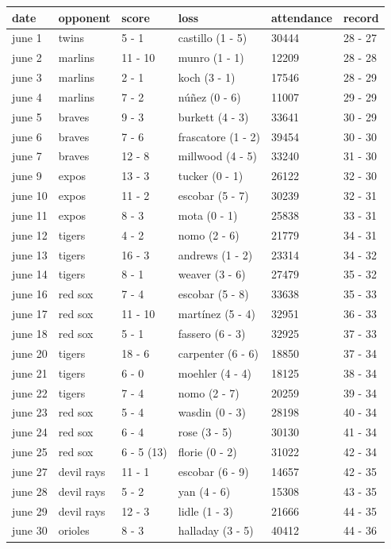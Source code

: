 \documentclass{article}
\begin{document}
\begin{tabular}{llllll}
\toprule
date & opponent & score & loss & attendance & record \\
\midrule
june 1 & twins & 5 - 1 & castillo (1 - 5) & 30444 & 28 - 27 \\
june 2 & marlins & 11 - 10 & munro (1 - 1) & 12209 & 28 - 28 \\
june 3 & marlins & 2 - 1 & koch (3 - 1) & 17546 & 28 - 29 \\
june 4 & marlins & 7 - 2 & núñez (0 - 6) & 11007 & 29 - 29 \\
june 5 & braves & 9 - 3 & burkett (4 - 3) & 33641 & 30 - 29 \\
june 6 & braves & 7 - 6 & frascatore (1 - 2) & 39454 & 30 - 30 \\
june 7 & braves & 12 - 8 & millwood (4 - 5) & 33240 & 31 - 30 \\
june 9 & expos & 13 - 3 & tucker (0 - 1) & 26122 & 32 - 30 \\
june 10 & expos & 11 - 2 & escobar (5 - 7) & 30239 & 32 - 31 \\
june 11 & expos & 8 - 3 & mota (0 - 1) & 25838 & 33 - 31 \\
june 12 & tigers & 4 - 2 & nomo (2 - 6) & 21779 & 34 - 31 \\
june 13 & tigers & 16 - 3 & andrews (1 - 2) & 23314 & 34 - 32 \\
june 14 & tigers & 8 - 1 & weaver (3 - 6) & 27479 & 35 - 32 \\
june 16 & red sox & 7 - 4 & escobar (5 - 8) & 33638 & 35 - 33 \\
june 17 & red sox & 11 - 10 & martínez (5 - 4) & 32951 & 36 - 33 \\
june 18 & red sox & 5 - 1 & fassero (6 - 3) & 32925 & 37 - 33 \\
june 20 & tigers & 18 - 6 & carpenter (6 - 6) & 18850 & 37 - 34 \\
june 21 & tigers & 6 - 0 & moehler (4 - 4) & 18125 & 38 - 34 \\
june 22 & tigers & 7 - 4 & nomo (2 - 7) & 20259 & 39 - 34 \\
june 23 & red sox & 5 - 4 & wasdin (0 - 3) & 28198 & 40 - 34 \\
june 24 & red sox & 6 - 4 & rose (3 - 5) & 30130 & 41 - 34 \\
june 25 & red sox & 6 - 5 (13) & florie (0 - 2) & 31022 & 42 - 34 \\
june 27 & devil rays & 11 - 1 & escobar (6 - 9) & 14657 & 42 - 35 \\
june 28 & devil rays & 5 - 2 & yan (4 - 6) & 15308 & 43 - 35 \\
june 29 & devil rays & 12 - 3 & lidle (1 - 3) & 21666 & 44 - 35 \\
june 30 & orioles & 8 - 3 & halladay (3 - 5) & 40412 & 44 - 36 \\
\bottomrule
\end{tabular}
\end{document}
